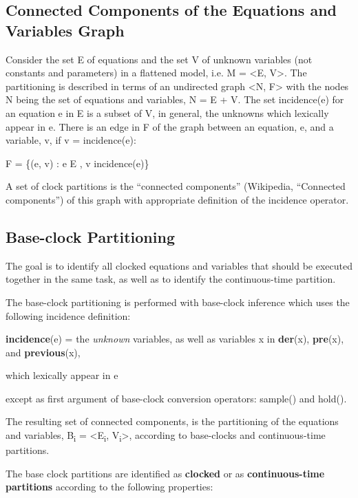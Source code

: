\documentclass[10pt,a4paper]{report}
\def\doublelabel#1{\label{#1}\hypertarget{#1}{}}
\begin{document}
\subsection{Connected Components of the Equations and Variables Graph}\doublelabel{connected-components-of-the-equations-and-variables-graph}

Consider the set E of equations and the set V of unknown variables (not
constants and parameters) in a flattened model, i.e. M = \textless{}E,
V\textgreater{}. The partitioning is described in terms of an undirected
graph \textless{}N, F\textgreater{} with the nodes N being the set of
equations and variables, N = E + V. The set incidence(e) for an equation
e in E is a subset of V, in general, the unknowns which lexically appear
in e. There is an edge in F of the graph between an equation, e, and a
variable, v, if v = incidence(e):

F = \{(e, v) : e E , v incidence(e)\}

A set of clock partitions is the ``connected components'' (Wikipedia,
``Connected components'') of this graph with appropriate definition of
the incidence operator.

\subsection{Base-clock Partitioning}\doublelabel{base-clock-partitioning}

The goal is to identify all clocked equations and variables that should
be executed together in the same task, as well as to identify the
continuous-time partition.

The base-clock partitioning is performed with base-clock inference which
uses the following incidence definition:

\textbf{incidence}(e) = the \emph{unknown} variables, as well as
variables x in \textbf{der}(x), \textbf{pre}(x), and
\textbf{previous}(x),

which lexically appear in e

except as first argument of base-clock conversion operators: sample()
and hold().

The resulting set of connected components, is the partitioning of the
equations and variables, B\textsubscript{i} =
\textless{}E\textsubscript{i}, V\textsubscript{i}\textgreater{},
according to base-clocks and continuous-time partitions.

The base clock partitions are identified as \textbf{clocked} or as
\textbf{continuous-time partitions} according to the following
properties:
\end{document}
